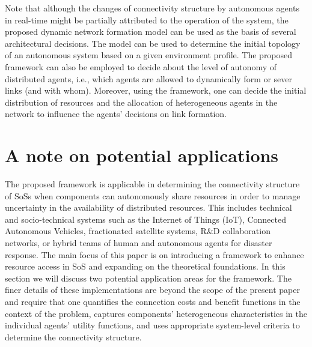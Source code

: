 \documentclass[journal,onecolumn]{IEEEtran}
\theoremstyle{plain}
\begin{document}
Note that although the changes of connectivity structure by autonomous agents in real-time might be partially attributed to the operation of the system, the proposed dynamic network formation model can be used as the basis of several architectural decisions. The model can be used to determine the initial topology of an autonomous system based on a given environment profile. The proposed framework can also be employed to decide about the level of autonomy of distributed agents, i.e., which agents are allowed to dynamically form or sever links (and with whom). Moreover, using the framework, one can decide the initial distribution of resources and the allocation of heterogeneous agents in the network to influence the agents' decisions on link formation.

\section{A note on potential applications}
\label{application}
The proposed framework is applicable in determining the connectivity structure of SoSs when components can autonomously share resources in order to manage uncertainty in the availability of distributed resources. This includes technical and socio-technical systems such as the Internet of Things (IoT), Connected Autonomous Vehicles, fractionated satellite systems, R\&D collaboration networks, or hybrid teams of human and autonomous agents for disaster response. The main focus of this paper is on introducing a framework to enhance resource access in SoS and expanding on the theoretical foundations. In this section we will discuss two potential application areas for the framework. The finer details of these implementations are beyond the scope of the present paper and require that one quantifies the connection costs and benefit functions in the context of the problem, captures components' heterogeneous characteristics in the individual agents' utility functions, and uses appropriate system-level criteria to determine the connectivity structure. 
\end{document}
